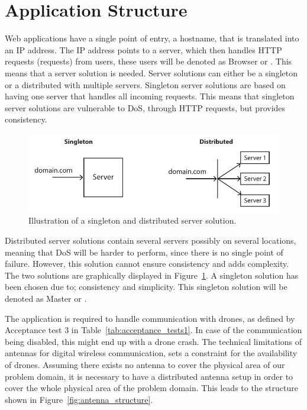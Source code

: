 \section{Application Structure}
\label{sec:application_structure}

Web applications have a single point of entry, a hostname, that is translated into an IP address.
The IP address points to a server, which then handles HTTP requests (requests) from users, these users will be denoted as Browser or .
This means that a server solution is needed.
Server solutions can either be a singleton or a distributed with multiple servers.
Singleton server solutions are based on having one server that handles all incoming requests.
This means that singleton server solutions are vulnerable to DoS, through HTTP requests, but provides consistency.

\begin{figure}[htb]
    \centering
    \includegraphics[width=\textwidth]{gfx/server_solutions.pdf}
    \caption{Illustration of a singleton and distributed server solution.}
    \label{fig:server_solutions}
\end{figure}

Distributed server solutions contain several servers possibly on several locations, meaning that DoS will be harder to perform, since there is no single point of failure.
However, this solution cannot ensure consistency and adds complexity.
The two solutions are graphically displayed in Figure~\ref{fig:server_solutions}.
A singleton solution has been chosen due to; consistency and simplicity.
This singleton solution will be denoted as Master or .

The application is required to handle communication with drones, as defined by Acceptance test 3 in Table~\ref{tab:acceptance_tests1}.
In case of the communication being disabled, this might end up with a drone crash.
The technical limitations of antennas for digital wireless communication, sets a constraint for the availability of drones.
Assuming there exists no antenna to cover the physical area of our problem domain, it is necessary to have a distributed antenna setup in order to cover the whole physical area of the problem domain.
This leads to the structure shown in Figure~\ref{fig:antenna_structure}.


